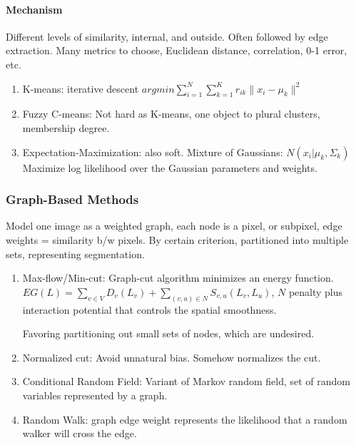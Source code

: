 \documentclass[10pt,a4paper]{article}
\begin{document}
\paragraph{Mechanism}
Different levels of similarity, internal, and outside.  Often followed by edge extraction. Many metrics to choose, Euclidean distance, correlation, 0-1 error, etc.
\begin{enumerate}
	\item K-means: iterative descent $argmin\sum_{i=1}^{N}\sum_{k=1}^{K}r_{ik}\|x_i-\mu_k\|^2$
	\item Fuzzy C-means: Not hard as K-means, one object to plural clusters, membership degree.
	\item Expectation-Maximization: also soft. Mixture of Gaussians: $N(x_i|\mu_k,\Sigma_k)$ Maximize log likelihood over the Gaussian parameters and weights.
\end{enumerate}

\subsubsection{Graph-Based Methods}
Model one image as a weighted graph, each node is a pixel, or subpixel, edge weights = similarity b/w pixels. By certain criterion, partitioned into multiple sets, representing segmentation.
\begin{enumerate}
	\item Max-flow/Min-cut: Graph-cut algorithm minimizes an energy function. $EG(L)=\sum_{v\in V}D_v(L_v)+\sum_{(v,u)\in N}S_{v,u}(L_v,L_u)$, $N$ penalty plus interaction potential that controls the spatial smoothness.\par
	Favoring partitioning out small sets of nodes, which are undesired.
	\item Normalized cut: Avoid unnatural bias. Somehow normalizes the cut.
	\item Conditional Random Field: Variant of Markov random field, set of random variables represented by a graph.
	\item Random Walk: graph edge weight represents the likelihood that a random walker will cross the edge.
\end{enumerate}

\newpage


\end{document}
